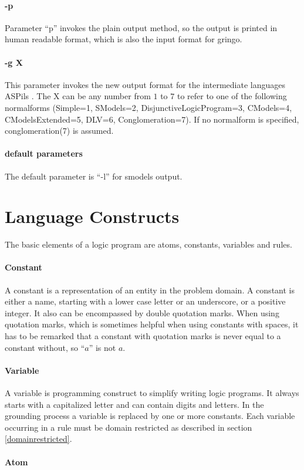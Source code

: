 \documentclass[a4paper,10pt]{article}
\begin{document}
\paragraph{-p}
Parameter ``p'' invokes the plain output method, so the output is printed in human readable format, which is also the input format for gringo.
\paragraph{-g X}
This parameter invokes the new output format for the intermediate languages ASPils \cite{atleastthisreferenceishouldgive}. The X can be any number from $1$ to $7$ to refer to one of the following normalforms (Simple=1, SModels=2, DisjunctiveLogicProgram=3, CModels=4, CModelsExtended=5, DLV=6, Conglomeration=7). If no normalform is specified, conglomeration(7)  is assumed.

\paragraph{default parameters}
The default parameter is ``-l'' for smodels output.
\section{Language Constructs}
The basic elements of a logic program are atoms, constants, variables and rules.
\paragraph{Constant}
A constant is a representation of an entity in the problem domain.
A constant is either a name, starting with a lower case letter or an underscore, or a positive integer.
It also can be encompassed by double quotation marks. When using quotation marks, which is sometimes helpful when using constants with spaces, it has to be remarked that a constant with quotation marks is never equal to a constant without, so ``$a$'' is not $a$.
\paragraph{Variable}
A variable is programming construct to simplify writing logic programs.
It always starts with a capitalized letter and can contain digits and letters.
In the grounding process a variable is replaced by one or more constants.
Each variable occurring in a rule must be domain restricted as described in section \ref{domainrestricted}.
\paragraph{Atom}
\end{document}
